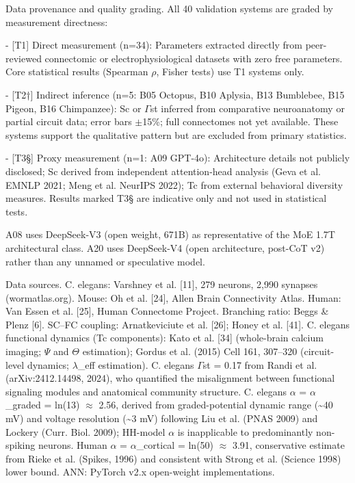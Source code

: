 \documentclass[a4paper,12pt]{article}
\begin{document}
Data provenance and quality grading. All 40 validation systems are graded by measurement directness:


- [T1] Direct measurement (n=34): Parameters extracted directly from peer-reviewed connectomic or electrophysiological datasets with zero free parameters. Core statistical results (Spearman $\rho$, Fisher tests) use T1 systems only.


- [T2†] Indirect inference (n=5: B05 Octopus, B10 Aplysia, B13 Bumblebee, B15 Pigeon, B16 Chimpanzee): Sc or $\Gamma$st inferred from comparative neuroanatomy or partial circuit data; error bars $\pm$15\%; full connectomes not yet available. These systems support the qualitative pattern but are excluded from primary statistics.


- [T3§] Proxy measurement (n=1: A09 GPT-4o): Architecture details not publicly disclosed; Sc derived from independent attention-head analysis (Geva et al. EMNLP 2021; Meng et al. NeurIPS 2022); Tc from external behavioral diversity measures. Results marked T3§ are indicative only and not used in statistical tests.


A08 uses DeepSeek-V3 (open weight, 671B) as representative of the MoE 1.7T architectural class. A20 uses DeepSeek-V4 (open architecture, post-CoT v2) rather than any unnamed or speculative model.


Data sources. C. elegans: Varshney et al. [11], 279 neurons, 2,990 synapses (wormatlas.org). Mouse: Oh et al. [24], Allen Brain Connectivity Atlas. Human: Van Essen et al. [25], Human Connectome Project. Branching ratio: Beggs \& Plenz [6]. SC--FC coupling: Arnatkeviciute et al. [26]; Honey et al. [41]. C. elegans functional dynamics (Tc components): Kato et al. [34] (whole-brain calcium imaging; $\Psi$ and $\Theta$ estimation); Gordus et al. (2015) Cell 161, 307--320 (circuit-level dynamics; $\lambda$_eff estimation). C. elegans $\Gamma$st = 0.17 from Randi et al. (arXiv:2412.14498, 2024), who quantified the misalignment between functional signaling modules and anatomical community structure. C. elegans $\alpha$ = $\alpha$_graded = ln(13) $\approx$ 2.56, derived from graded-potential dynamic range (\textasciitilde{}40 mV) and voltage resolution (\textasciitilde{}3 mV) following Liu et al. (PNAS 2009) and Lockery (Curr. Biol. 2009); HH-model $\alpha$ is inapplicable to predominantly non-spiking neurons. Human $\alpha$ = $\alpha$_cortical = ln(50) $\approx$ 3.91, conservative estimate from Rieke et al. (Spikes, 1996) and consistent with Strong et al. (Science 1998) lower bound. ANN: PyTorch v2.x open-weight implementations.
\end{document}
